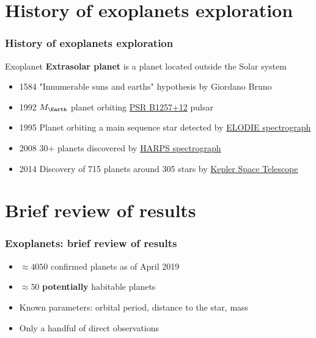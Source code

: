 \documentclass[aspectratio=169]{beamer}
\begin{document}
\section{History of exoplanets exploration}
\begin{frame}
\frametitle{History of exoplanets exploration}
\begin{block}{Exoplanet}
{\bf Extrasolar planet} is a planet located outside the Solar system
\end{block}
\begin{itemize}
\item 1584 "Innumerable suns and earths" hypothesis by Giordano Bruno
\item 1992 $M_\Earth$ planet orbiting \href{https://en.wikipedia.org/wiki/PSR_B1257\%2B12}{PSR B1257+12} pulsar
\item 1995 Planet orbiting a main sequence star detected by
      \href{http://www.obs-hp.fr/guide/elodie/elodie-eng.html}{ELODIE spectrograph}
\item 2008 30+ planets discovered by \href{http://www.eso.org/sci/facilities/lasilla/instruments/harps.html}{HARPS spectrograph}
\item 2014 Discovery of 715 planets around 305 stars by %
      \href{http://www.nasa.gov/mission_pages/kepler/main/index.html}{Kepler Space Telescope}
\end{itemize}
\end{frame}


\section{Brief review of results}
\begin{frame}
\frametitle{Exoplanets: brief review of results}
\begin{itemize}
\item $\approx 4050$ confirmed planets as of April 2019 \cite{exoplanet.eu}
\item $\approx 50$ {\bf potentially} habitable planets
\item Known parameters: orbital period, distance to the star, mass
\item Only a handful of direct observations
\end{itemize}
\end{frame}
\end{document}
